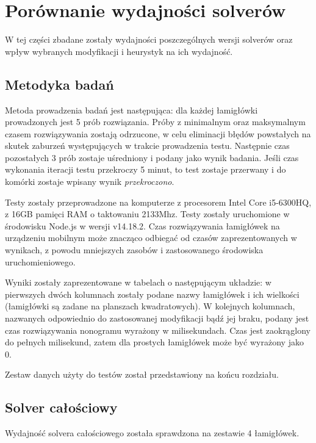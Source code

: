 \section{Porównanie wydajności solverów}
    W tej części zbadane zostały wydajności poszczególnych wersji solverów oraz wpływ wybranych
modyfikacji i heurystyk na ich wydajność.


\subsection{Metodyka badań}
    Metoda prowadzenia badań jest następująca: dla każdej łamigłówki prowadzonych jest 5 prób 
rozwiązania. Próby z minimalnym oraz maksymalnym czasem rozwiązywania zostają odrzucone, w celu
eliminacji błędów powstałych na skutek zaburzeń występujących w trakcie prowadzenia testu. Następnie
czas pozostałych 3 prób zostaje uśredniony i podany jako wynik badania. Jeśli czas wykonania
iteracji testu przekroczy 5 minut, to test zostaje przerwany i do komórki zostaje wpisany wynik
\textit{przekroczono}.

    Testy zostały przeprowadzone na komputerze z procesorem Intel Core i5-6300HQ, z
16GB pamięci RAM o taktowaniu 2133Mhz. Testy zostały uruchomione w środowisku Node.js \cite{node}
w wersji v14.18.2. Czas rozwiązywania łamigłówek na urządzeniu mobilnym może znacząco odbiegać
od czasów zaprezentowanych w wynikach, z powodu mniejszych zasobów i zastosowanego środowiska
uruchomieniowego.

    Wyniki zostały zaprezentowane w tabelach o następującym układzie: w pierwszych dwóch kolumnach
zostały podane nazwy łamigłówek i ich wielkości (łamigłówki są zadane na planszach kwadratowych).
W kolejnych kolumnach, nazwanych odpowiednio do zastosowanej modyfikacji bądź jej braku,
podany jest czas rozwiązywania nonogramu wyrażony w milisekundach. Czas jest zaokrąglony do pełnych
milisekund, zatem dla prostych łamigłówek może być wyrażony jako 0.

    Zestaw danych użyty do testów został przedstawiony na końcu rozdziału.


\subsection{Solver całościowy}
    Wydajność solvera całościowego została sprawdzona na zestawie 4 łamigłówek.

